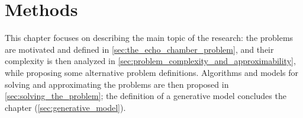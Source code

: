 \chapter{Methods}
\label{ch:methods}

This chapter focuses on describing the main topic of the
research: the problems are motivated and defined in
\autoref{sec:the_echo_chamber_problem}, and their complexity is then analyzed
in \autoref{sec:problem_complexity_and_approximability}, while proposing some
alternative problem definitions. Algorithms and models for solving and
approximating the problems are then proposed in
\autoref{sec:solving_the_problem}; the definition of a generative model
concludes the chapter (\autoref{sec:generative_model}).



